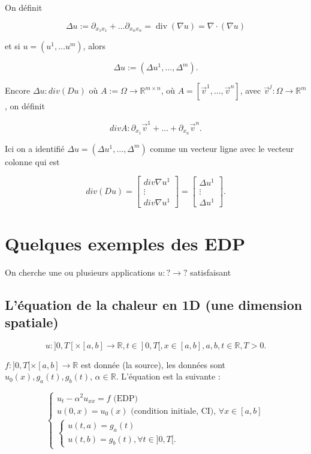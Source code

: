 \documentclass[french]{article}
\theoremstyle{definition}
\newcommand{\bg}{>}
\begin{document}
On définit

\[\Delta u := \partial _{x_1 x_1} + \dots \partial _{x_n x_n} = \operatorname{div}(\nabla u) = \nabla \cdot(\nabla u)\]

et si \(u =(u ^{1}, \dots u ^{m})\), alors

\[\Delta u := (\Delta u ^{1}, \dots, \Delta ^{m}).\]

Encore \(\Delta u : div (D u)\) où \(A := \Omega \longrightarrow \mathbb{R} ^{m \times n}\), où \(A = [\overrightarrow{v}^{1}, \dots, \overrightarrow{v}^{n}]\), avec \(\overrightarrow{v}^{j} : \Omega \longrightarrow \mathbb{R}^m\), on définit

\[div A : \partial _{x_1} \overrightarrow{v}^{1} + \dots + \partial _{x_n}\overrightarrow{v}^{n}.\]

Ici on a identifié \(\Delta u = (\Delta u ^{1}, \dots, \Delta ^{m})\) comme un vecteur ligne avec le vecteur colonne qui est

\[div (Du) = \begin{bmatrix}
  div \nabla u ^{1}\\
  \vdots \\
  div \nabla u ^{1}
\end{bmatrix} = \begin{bmatrix}
  \Delta u ^{1}\\
  \vdots \\
  \Delta u ^{1}
\end{bmatrix}.\]

\section{Quelques exemples des EDP}

On cherche une ou plusieurs applications \(u : ? \longrightarrow ?\) satisfaisant

\subsection{L'équation de la chaleur en 1D (une dimension spatiale)}


\[ u : ]0,T[ \times [a,b] \longrightarrow \mathbb{R}, t \in ]0,T[, x \in [a,b],a,b,t \in \mathbb{R}, T \bg 0.\]

\(f : ]0,T[\times [a,b] \longrightarrow \mathbb{R}\) est donnée (la source), les données sont \(u_0(x), g_a(t), g_b(t)\), \(\alpha \in \mathbb{R}\). L'équation est la suivante :

\begin{equation}\label{chaleur}
  \begin{cases}
    u_t - \alpha ^2 u _{xx} = f \text{ (EDP)}  \\
    u(0,x) = u_0(x) \text{ (condition initiale, CI), } \forall x \in [a,b] \\
    \begin{cases}
      u(t,a) = g_a(t) \\
      u(t,b) = g_b(t), \forall t \in ]0,T[.
    \end{cases}
  \end{cases}
\end{equation}
\end{document}

